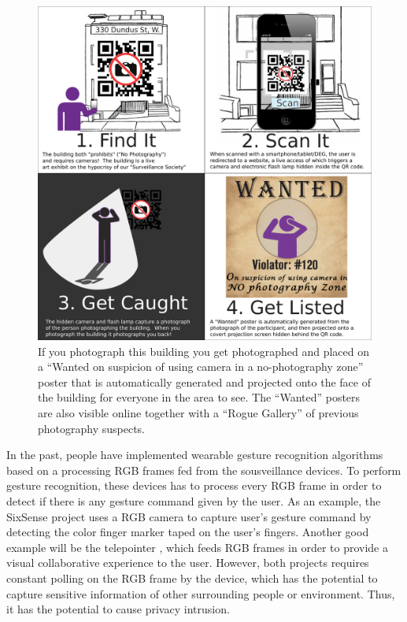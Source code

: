 \begin{figure}
  \centering
  \includegraphics[width=6.0in]{ch5/figs/signo330infographics_small.pdf}
  \caption{If you photograph this building you get photographed and placed on
           a ``Wanted on suspicion of using camera in a no-photography zone''
           poster that is automatically generated and projected onto the face
           of the building for everyone in the area to see.  The
           ``Wanted'' posters are also visible online together with
           a ``Rogue Gallery'' of previous photography suspects.}
  \label{infographic}
\end{figure}

In the past, people have implemented wearable gesture recognition algorithms based on a processing RGB frames fed from the sousveillance devices. To perform gesture recognition, these devices has to process every RGB frame in order to detect if there is any gesture command given by the user. As an example, the SixSense project uses a RGB camera to capture user's gesture command by detecting the color finger marker taped on the user's fingers. Another good example will be the telepointer \cite{mann2000telepointer}, which feeds RGB frames in order to provide a visual collaborative experience to the user.  However, both projects requires constant polling on the RGB frame by the device, which has the potential to capture sensitive information of other surrounding people or environment. Thus, it has the potential to cause privacy intrusion. 

